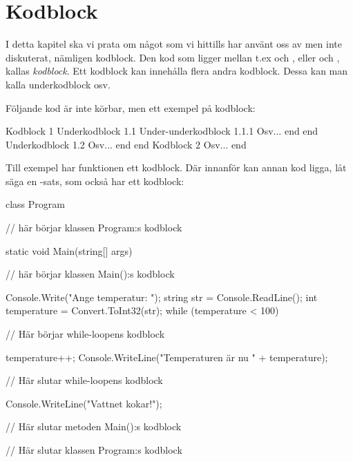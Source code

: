 %
%
\chapter{Kodblock}\label{ch:kodblock}
I detta kapitel ska vi prata om något som vi hittills har använt oss av men inte diskuterat, nämligen kodblock. Den kod som ligger mellan t.ex  och , eller  och , kallas \emph{kodblock}. Ett kodblock kan innehålla flera andra kodblock. Dessa kan man kalla underkodblock osv.

Följande kod är inte körbar, men ett exempel på kodblock:

\begin{csharp}[caption={Kodblock},label={}]
Kodblock 1
    Underkodblock 1.1
        Under-underkodblock 1.1.1
            Osv...
        end
    end
    Underkodblock 1.2
        Osv...
    end
end
Kodblock 2
    Osv...
end
\end{csharp}

Till exempel har funktionen  ett kodblock. Där innanför kan annan kod ligga, låt säga en -sats, som också har ett kodblock:

\begin{csharp}[caption={Kodblock med kommentarer},label={}]
class Program
{ // här börjar klassen Program:s kodblock

	static void Main(string[] args)
	{ // här börjar klassen Main():s kodblock

		Console.Write("Ange temperatur: ");
		string str = Console.ReadLine();
		int temperature = Convert.ToInt32(str);
		while (temperature < 100)
		{ // Här börjar while-loopens kodblock

			temperature++;
			Console.WriteLine("Temperaturen är nu " + temperature);

		} // Här slutar while-loopens kodblock

		Console.WriteLine("Vattnet kokar!");

	} // Här slutar metoden Main():s kodblock

} // Här slutar klassen Program:s kodblock

\end{csharp}

